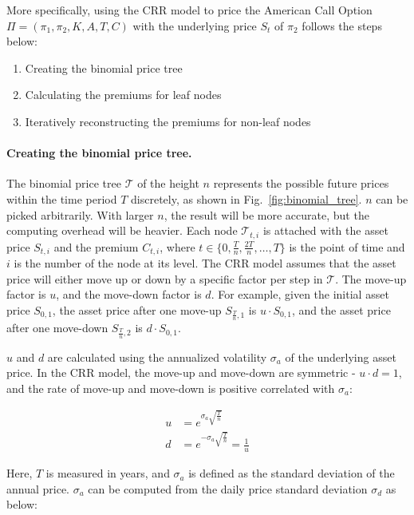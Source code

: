 More specifically, using the CRR model to price the American Call Option $\Pi = (\pi_1, \pi_2, K, A, T, C)$ with the underlying price $S_t$ of $\pi_2$ follows the steps below:

\begin{enumerate}
    \item Creating the binomial price tree
    \item Calculating the premiums for leaf nodes
    \item Iteratively reconstructing the premiums for non-leaf nodes 
\end{enumerate}

\paragraph{Creating the binomial price tree.}
The binomial price tree $\mathcal{T}$ of the height $n$ represents the possible future prices within the time period $T$ discretely, as shown in Fig.~\ref{fig:binomial_tree}.
$n$ can be picked arbitrarily. With larger $n$, the result will be more accurate, but the computing overhead will be heavier.
Each node $\mathcal{T}_{t, i}$ is attached with the asset price $S_{t, i}$ and the premium $C_{t, i}$,
where $t \in \{0, \frac{T}{n}, \frac{2T}{n}, \dots, T\}$ is the point of time and $i$ is the number of the node at its level.
The CRR model assumes that the asset price will either move up or down by a specific factor per step in $\mathcal{T}$.
The move-up factor is $u$, and the move-down factor is $d$.
For example, given the initial asset price $S_{0, 1}$, the asset price after one move-up $S_{\frac{T}{n}, 1}$ is $u \cdot S_{0, 1}$, and the asset price after one move-down $S_{\frac{T}{n}, 2}$ is $d \cdot S_{0, 1}$.

$u$ and $d$ are calculated using the annualized volatility $\sigma_a$ of the underlying asset price.
In the CRR model, the move-up and move-down are symmetric - $u \cdot d = 1$, and the rate of move-up and move-down is positive correlated with $\sigma_a$:

\begin{align} 
u &= e^{\sigma_a \sqrt{\frac{T}{n}}}\\
d &= e^{- \sigma_a \sqrt{\frac{T}{n}}} = \frac{1}{u}
\end{align}

Here, $T$ is measured in years, and $\sigma_a$ is defined as the standard deviation of the annual price.
$\sigma_a$ can be computed from the daily price standard deviation $\sigma_d$ as below:

